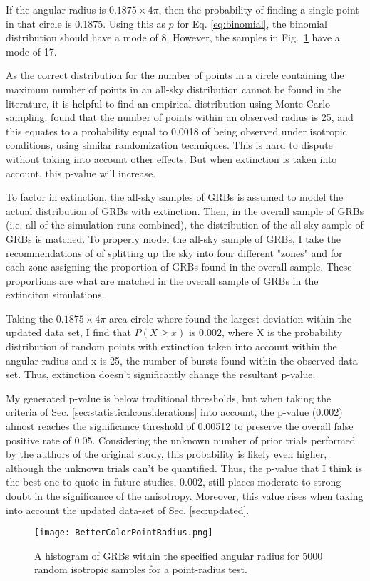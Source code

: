 \documentclass[fleqn,usenatbib]{mnras}
\begin{document}
If the angular radius is \(0.1875 ×4\pi\), then the probability of finding a single point in that circle is 0.1875. Using this as $p$ for Eq. \ref{eq:binomial}, the binomial distribution should have a mode of 8. However, the samples in Fig.~\ref{figure:point-radius-random} have a mode of 17.

As the correct distribution for the number of points in a circle containing the maximum number of points in an all-sky distribution cannot be found in the literature, it is helpful to find an empirical distribution using Monte Carlo sampling. \citet{horvath2014} found that the number of points within an observed radius is 25, and this equates to a probability equal to 0.0018 of being observed under isotropic conditions, using similar randomization techniques. This is hard to dispute without taking into account other effects. But when extinction is taken into account, this p-value will increase. 

To factor in extinction, the all-sky samples of GRBs is assumed to model the actual distribution of GRBs with extinction. Then, in the overall sample of GRBs (i.e. all of the simulation runs combined), the distribution of the all-sky sample of GRBs is matched. To properly model the all-sky sample of GRBs, I take the recommendations of \citet{horvath2014} of splitting up the sky into four different "zones" and for each zone assigning the proportion of GRBs found in the overall sample. These proportions are what are matched in the overall sample of GRBs in the extinciton simulations.

Taking the \(0.1875 ×4\pi\) area circle where \citet{horvath2015} found the largest deviation within the updated data set, I find that $P(X\geq x)$  is 0.002, where X is the probability distribution of random points with extinction taken into account within the angular radius and x is 25, the number of bursts found within the observed data set. Thus, extinction doesn't significantly change the resultant p-value.

My generated p-value is below traditional thresholds, but when taking the criteria of Sec. \ref{sec:statisticalconsiderations} into account, the p-value (0.002) almost reaches the significance threshold of 0.00512 to preserve the overall false positive rate of 0.05. Considering the unknown number of prior trials performed by the authors of the original study, this probability is likely even higher, although the unknown trials can't be quantified. Thus, the p-value that I think is the best one to quote in future studies, 0.002, still places moderate to strong doubt in the significance of the anisotropy. Moreover, this value rises when taking into account the updated data-set of Sec. \ref{sec:updated}.
\begin{figure}
    \centering
    \texttt{[image: BetterColorPointRadius.png]}
    \caption{A histogram of GRBs within the specified angular radius for 5000 random isotropic samples for a point-radius test.}
    \label{figure:point-radius-random}
\end{figure}
\end{document}
